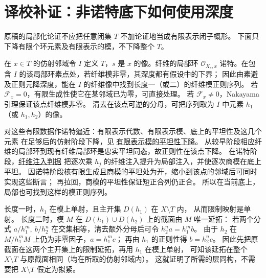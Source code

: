 \documentclass[openany,fontset=fandol]{ctexbook}
\newcommand{\OO}{\mathcal O}
\newcommand{\FF}{\mathcal F}
\begin{document}
\clearpage
\section*{译校补证：非诺特底下如何使用深度}
原稿的局部化论证不应把任意闭集 \(T\) 不加论证地当成有限表示闭子概形。
下面只下降有限个环元素及有限表示的模，不下降整个 \(T\)。

在 \(x\in T\) 的仿射邻域令 \(I\) 定义 \(T\)，\(s\) 是 \(x\) 的像。纤维的局部环
\(\OO_{X_s,x}\) 诺特。在包含 \(I\) 的该局部环素点处，若纤维模非零，其深度都有假设中的下界；
因此由素避及正则元降深度，能在 \(I\) 的纤维像中找到长度一（或二）的纤维模正则序列。
若 \(\FF_x=0\)，有限生成性使它在某邻域已为零，可直接处理。
若 \(\FF_x\ne0\)，Nakayama 引理保证该点纤维模非零。
清去在该点可逆的分母，可把序列取为 \(I\) 中元素 \(h_1\)（或 \(h_1,h_2\)）的像。

对这些有限数据作诺特逼近：有限表示代数、有限表示模、底上的平坦性及这几个元素
在足够后的仿射阶段下降，见 \href{https://stacks.math.columbia.edu/tag/00R3}{有限表示模的平坦性下降}。
从较早阶段相应纤维的局部环到现有纤维局部环是忠实平坦同态，故正则性在该点下降。
在诺特阶段，\href{https://stacks.math.columbia.edu/tag/00ME}{纤维注入判据}
把逐次乘 \(h_j\) 的纤维注入提升为局部注入，并使逐次商模在底上平坦。
因诺特阶段核有限生成且商模的平坦处为开，缩小到该点的邻域后可同时实现这些断言；
再拉回，商模的平坦性保证短正合列仍正合。
所以在当前底上，局部也可找到这样的模正则序列。

长度一时，\(h_1\) 在模上单射，且主开集 \(D(h_1)\) 在 \(X\setminus T\) 内，
从而限制映射是单射。
长度二时，模 \(M\) 在 \(D(h_1)\cup D(h_2)\) 上的截面由 \(M\) 唯一延拓：
若两个分式 \(a/h_1^m,\ b/h_2^n\) 在交集相等，清去额外分母后可令 \(h_2^n a=h_1^m b\)。
由于 \(h_2\) 在 \(M/h_1^mM\) 上仍为非零因子，\(a=h_1^m c\)；
再由 \(h_1\) 的正则性得 \(b=h_2^n c\)。
因此先把原截面在这两个主开集上的限制延拓，再用 \(h_1\) 在模上单射，
可知该延拓在整个 \(X\setminus T\) 与原截面相同（均在所取的仿射邻域内）。
这就证明了所需的层同构，不需要把 \(X\setminus T\) 假定为拟紧。
\end{document}
